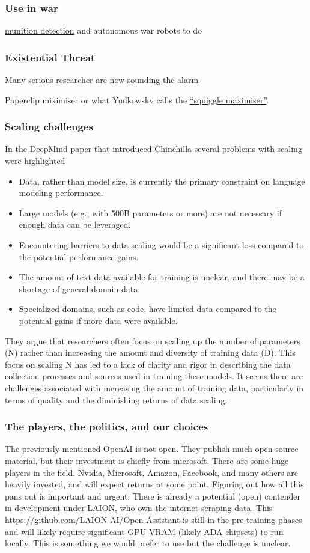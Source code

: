 \subsubsection{Use in war}
\href{https://vframe.io/9n235/}{munition detection}  and autonomous war robots to do
\subsubsection{Existential Threat}
Many serious researcher are now sounding the alarm 

Paperclip miximiser \cite{bostrom2003ethical}
or what Yudkowsky calls the \href{https://www.lesswrong.com/tag/squiggle-maximizer-formerly-paperclip-maximizer}{``squiggle maximiser''}.
\subsubsection{Scaling challenges}
In the DeepMind paper that introduced Chinchilla \cite{hoffmann2022empirical} several problems with scaling were highlighted
\begin{itemize}
\item Data, rather than model size, is currently the primary constraint on language modeling performance.
\item Large models (e.g., with 500B parameters or more) are not necessary if enough data can be leveraged.
\item Encountering barriers to data scaling would be a significant loss compared to the potential performance gains.
\item The amount of text data available for training is unclear, and there may be a shortage of general-domain data.
\item Specialized domains, such as code, have limited data compared to the potential gains if more data were available.
\end{itemize}
They argue that researchers often focus on scaling up the number of parameters (N) rather than increasing the amount and diversity of training data (D). This focus on scaling N has led to a lack of clarity and rigor in describing the data collection processes and sources used in training these models. It seems  there are challenges associated with increasing the amount of training data, particularly in terms of quality and the diminishing returns of data scaling. 
\subsubsection{The players, the politics, and our choices}
The previously mentioned OpenAI is not open. They publish much open source material, but their investment is chiefly from microsoft. There are some huge players in the field. Nvidia, Microsoft, Amazon, Facebook, and many others are heavily invested, and will expect returns at some point. Figuring out how all this pans out is important and urgent. There is already a potential (open) contender in development under LAION, who own the internet scraping data. This \href{'Open-Assistant'}{https://github.com/LAION-AI/Open-Assistant} is still in the pre-training phases and will likely require significant GPU VRAM (likely ADA chipsets) to run locally. This is something we would prefer to use but the challenge is unclear.
